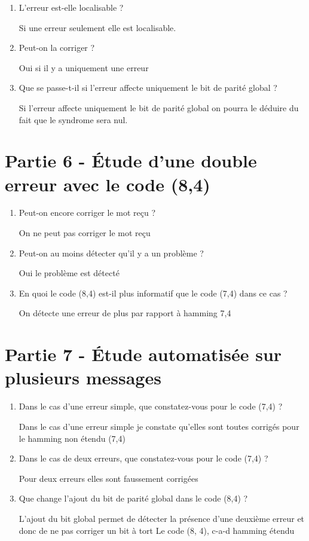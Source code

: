 \documentclass{article}
\begin{document}
\begin{enumerate}
\item L'erreur est-elle localisable ? 

Si une erreur seulement elle est localisable.
\item Peut-on la corriger ? 

Oui si il y a uniquement une erreur
\item Que se passe-t-il si l'erreur affecte uniquement le bit de parité global ? 

Si l'erreur affecte uniquement le bit de parité global on pourra le déduire du fait que le syndrome sera nul.
\end{enumerate}

\section{Partie 6 - Étude d'une double erreur avec le code (8,4)}

\begin{enumerate}
\item Peut-on encore corriger le mot reçu ? 

On ne peut pas corriger le mot reçu
\item Peut-on au moins détecter qu'il y a un problème ? 

Oui le problème est détecté
\item En quoi le code (8,4) est-il plus informatif que le code (7,4) dans ce cas ? 

On détecte une erreur de plus par rapport à hamming 7,4
\end{enumerate}

\section{Partie 7 - Étude automatisée sur plusieurs messages}
\begin{enumerate}
\item Dans le cas d’une erreur simple, que constatez-vous pour le code (7,4) ? 

Dans le cas d'une erreur simple je constate qu'elles sont toutes corrigés pour le hamming non étendu (7,4)
\item Dans le cas de deux erreurs, que constatez-vous pour le code (7,4) ? 

Pour deux erreurs elles sont faussement corrigées
\item Que change l'ajout du bit de parité global dans le code (8,4) ? 

L'ajout du bit global permet de détecter la présence d'une deuxième erreur et donc de ne pas corriger un bit à tort
Le code (8, 4), c-a-d hamming étendu
\end{enumerate}
\end{document}
